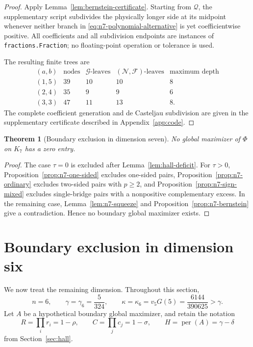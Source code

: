 \documentclass[11pt,a4paper]{article}
\numberwithin{equation}{section}
\newtheorem{theorem}{Theorem}[section]
\theoremstyle{definition}
\newcommand{\per}{\operatorname{per}}
\newcommand{\1}{\mathbf{1}}
\begin{document}
\begin{proof}
Apply Lemma~\ref{lem:bernstein-certificate}.  Starting from $\mathcal Q$,
the supplementary script subdivides the physically longer side at its
midpoint whenever neither branch in
\eqref{eq:n7-polynomial-alternative} is yet coefficientwise positive.  All
coefficients and all subdivision endpoints are instances of
\texttt{fractions.Fraction}; no floating-point operation or tolerance is
used.

The resulting finite trees are
\begin{equation}\label{eq:n7-bernstein-tree}
\begin{array}{c|rrrr}
(a,b)&\text{nodes}&\mathcal G\text{-leaves}&
 (\mathcal N,\mathcal F)\text{-leaves}&\text{maximum depth}\\ \hline
(1,5)&39&10&10&8\\
(2,4)&35&9&9&6\\
(3,3)&47&11&13&8.
\end{array}
\end{equation}
The complete coefficient generation and de Casteljau subdivision are given
in the supplementary certificate described in Appendix~\ref{app:code}.
\end{proof}

\begin{theorem}[Boundary exclusion in dimension seven]
\label{thm:boundary-seven}
No global maximizer of $\Phi$ on $K_7$ has a zero entry.
\end{theorem}

\begin{proof}
The case $\tau=0$ is excluded after Lemma~\ref{lem:hall-deficit}.
For $\tau>0$, Proposition~\ref{prop:n7-one-sided} excludes one-sided pairs,
Proposition~\ref{prop:n7-ordinary} excludes two-sided pairs with $p\ge2$,
and Proposition~\ref{prop:n7-sign-mixed} excludes single-bridge pairs with a
nonpositive complementary excess.  In the remaining case,
Lemma~\ref{lem:n7-squeeze} and Proposition~\ref{prop:n7-bernstein} give a
contradiction.  Hence no boundary global maximizer exists.
\end{proof}


\section{Boundary exclusion in dimension six}\label{sec:n6}

We now treat the remaining dimension.  Throughout this section,
\begin{equation}\label{eq:n6-gamma-kappa}
 n=6,\qquad
 \gamma=\gamma_6=\frac5{324},\qquad
 \kappa=\kappa_6=v_5G(5)=\frac{6144}{390625}>\gamma.
\end{equation}
Let $A$ be a hypothetical boundary global maximizer, and retain the notation
\[
 R=\prod_i r_i=1-\rho,\qquad
 C=\prod_jc_j=1-\sigma,\qquad
 H=\per(A)=\gamma-\delta
\]
from Section~\ref{sec:hall}.
\end{document}
